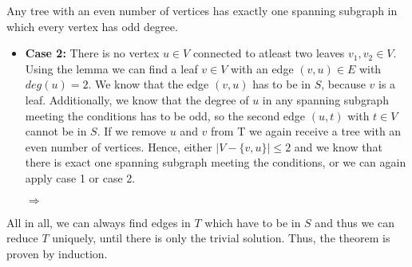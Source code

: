 \documentclass[a4paper]{article}
\begin{document}
\begin{solution}{6}
\begin{theorem}{Any tree with an even number of vertices has exactly one spanning subgraph in which every vertex has odd degree.}
\begin{itemize}
				
				\item \textbf{Case 2:} There is no vertex $u \in V$ connected to atleast two leaves $v_1, v_2 \in V$. \\
				Using the lemma we can find a leaf $v \in V$ with an edge $(v,u) \in E$ with $deg(u)=2$. 
				We know that the edge $(v,u)$ has to be in $S$, because $v$ is a leaf. 
				Additionally, we know that the degree of $u$ in any spanning subgraph meeting the conditions has to be odd, so the second edge $(u,t)$ with $t \in V$ cannot be in $S$. 
				If we remove $u$ and $v$ from T we again receive a tree with an even number of vertices. 
				Hence, either $|V- \{v,u\}| \leq 2$ and we know that there is exact one spanning subgraph meeting the conditions, or we can again apply case 1 or case 2. 
				\begin{center}
				 $\Rightarrow$
			\end{center}
			\end{itemize}
		All in all, we can always find edges in $T$ which have to be in $S$ and thus we can reduce $T$ uniquely, until there is only the trivial solution. 
		Thus, the theorem is proven by induction. 
		\end{theorem}
	\end{solution} 
	\newpage
\end{document}
